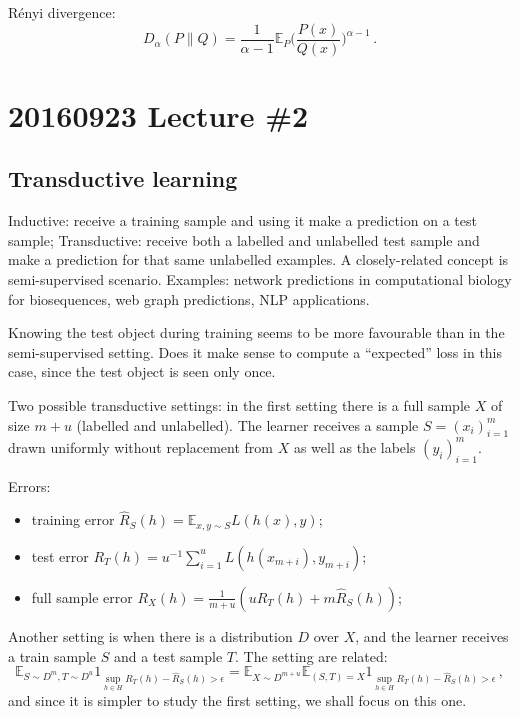 \documentclass[a4paper]{article}
\newcommand{\ex}{\mathbb{E}}
\begin{document}
R\'enyi divergence:
\[ D_\alpha(P\|Q)
    = \frac{1}{\alpha - 1} \ex_P \biggl(\frac{P(x)}{Q(x)}\biggr)^{\alpha - 1}
    \,. \]



\section{20160923 Lecture \#2} %
\label{sec:20160923_lecture_2}

\subsection{Transductive learning} %
\label{sub:transductive_learning}

Inductive: receive a training sample and using it make a prediction on a test sample;
Transductive: receive both a labelled and unlabelled test sample and make a prediction
for that same unlabelled examples. A closely-related concept is semi-supervised
scenario. Examples: network predictions in computational biology for biosequences,
web graph predictions, NLP applications.

Knowing the test object during training seems to be more favourable than in the
semi-supervised setting. Does it make sense to compute a ``expected'' loss in this
case, since the test object is seen only once.

Two possible transductive settings: in the first setting there is a full sample
$X$ of size $m + u$ (labelled and unlabelled). The learner receives a sample $S=(x_i)_{i=1}^m$
drawn uniformly without replacement from $X$ as well as the labels $(y_i)_{i=1}^m$.

Errors:\begin{itemize}
    \item training error $\hat{R}_S(h) = \ex_{x, y\sim S} L(h(x), y)$;
    \item test error $R_T(h) = u^{-1} \sum_{i=1}^u L(h(x_{m+i}), y_{m+i})$;
    \item full sample error $R_X(h) = \frac{1}{m+u}(u R_T(h) + m \hat{R}_S(h))$;
\end{itemize}

Another setting is when there is a distribution $D$ over $X$, and the learner receives
a train sample $S$ and a test sample $T$. The setting are related:
\[ \ex_{S\sim D^m, T\sim D^u}
        1_{\sup_{h\in H} R_T(h) - \hat{R}_S(h) > \epsilon} 
    = \ex_{X\sim D^{m+u}} \ex_{(S, T) = X}
        1_{\sup_{h\in H} R_T(h) - \hat{R}_S(h) > \epsilon}
    \,, \]
and since it is simpler to study the first setting, we shall focus on this one.
\end{document}
